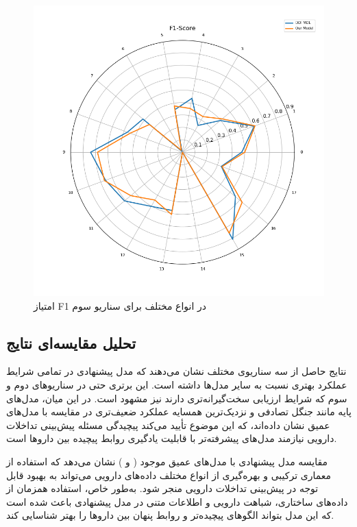 \begin{figure}[t]
	\centering
	\includegraphics[width=\textwidth]{images/s4-f1-score.png}
	\caption{ امتیاز F1 در انواع مختلف برای سناریو سوم }
	\label{fig:s4_f1_score}
\end{figure}

\subsection{تحلیل مقایسه‌ای نتایج}

نتایج حاصل از سه سناریوی مختلف نشان می‌دهند که مدل پیشنهادی در تمامی شرایط عملکرد بهتری نسبت به سایر مدل‌ها داشته است. این برتری حتی در سناریوهای دوم و سوم که شرایط ارزیابی سخت‌گیرانه‌تری دارند نیز مشهود است. در این میان، مدل‌های پایه مانند جنگل تصادفی و نزدیک‌ترین همسایه عملکرد ضعیف‌تری در مقایسه با مدل‌های عمیق نشان داده‌اند، که این موضوع تأیید می‌کند پیچیدگی مسئله پیش‌بینی تداخلات دارویی نیازمند مدل‌های پیشرفته‌تر با قابلیت یادگیری روابط پیچیده بین داروها است.

مقایسه مدل پیشنهادی با مدل‌های عمیق موجود ( و ) نشان می‌دهد که استفاده از معماری ترکیبی و بهره‌گیری از انواع مختلف داده‌های دارویی می‌تواند به بهبود قابل توجه در پیش‌بینی تداخلات دارویی منجر شود. به‌طور خاص، استفاده همزمان از داده‌های ساختاری، شباهت دارویی و اطلاعات متنی در مدل پیشنهادی باعث شده است که این مدل بتواند الگوهای پیچیده‌تر و روابط پنهان بین داروها را بهتر شناسایی کند.

